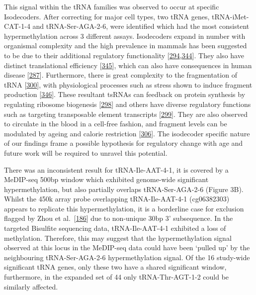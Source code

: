 \documentclass[
]{book}
\begin{document}
This signal within the tRNA families was observed to occur at specific Isodecoders.
After correcting for major cell types, two tRNA genes, tRNA-iMet-CAT-1-4 and tRNA-Ser-AGA-2-6, were identified which had the most consistent hypermethylation across 3 different assays.
Isodecoders expand in number with organismal complexity and the high prevalence in mammals has been suggested to be due to their additional regulatory functionality {[}\protect\hyperlink{ref-Keam2014}{294},\protect\hyperlink{ref-Goodenbour2006}{344}{]}.
They also have distinct translational efficiency {[}\protect\hyperlink{ref-Geslain2010}{345}{]}, which can also have consequences in human disease {[}\protect\hyperlink{ref-Kirchner2017}{287}{]}.
Furthermore, there is great complexity to the fragmentation of tRNA {[}\protect\hyperlink{ref-Schimmel2017}{300}{]}, with physiological processes such as stress shown to induce fragment production {[}\protect\hyperlink{ref-Li2019}{346}{]}.
These resultant tsRNAs can feedback on protein synthesis by regulating ribosome biogenesis {[}\protect\hyperlink{ref-Kim2017}{298}{]} and others have diverse regulatory functions such as targeting transposable element transcripts {[}\protect\hyperlink{ref-Martinez2017}{299}{]}.
They are also observed to circulate in the blood in a cell-free fashion, and fragment levels can be modulated by ageing and calorie restriction {[}\protect\hyperlink{ref-Dhahbi2013}{306}{]}.
The isodecoder specific nature of our findings frame a possible hypothesis for regulatory change with age and future work will be required to unravel this potential.

There was an inconsistent result for tRNA-Ile-AAT-4-1, it is covered by a MeDIP-seq 500bp window which exhibited genome-wide significant hypermethylation, but also partially overlaps tRNA-Ser-AGA-2-6 (Figure 3B).
Whilst the 450k array probe overlapping tRNA-Ile-AAT-4-1 (cg06382303) appears to replicate this hypermethylation, it is a borderline case for exclusion flagged by Zhou et al.~{[}\protect\hyperlink{ref-Zhou2017}{186}{]} due to non-unique 30bp 3' subsequence.
In the targeted Bisulfite sequencing data, tRNA-Ile-AAT-4-1 exhibited a loss of methylation.
Therefore, this may suggest that the hypermethylation signal observed at this locus in the MeDIP-seq data could have been `pulled up' by the neighbouring tRNA-Ser-AGA-2-6 hypermethylation signal.
Of the 16 study-wide significant tRNA genes, only these two have a shared significant window, furthermore, in the expanded set of 44 only tRNA-Thr-AGT-1-2 could be similarly affected.
\end{document}
